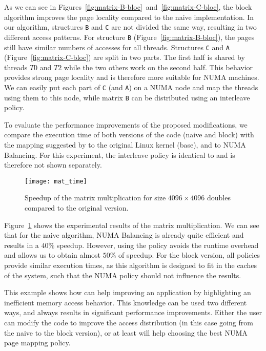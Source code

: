 As we can see in Figures~\ref{fig:matrix-B-bloc}~and~\ref{fig:matrix-C-bloc}, the block algorithm improves the page
locality compared to the naive implementation. In our algorithm, structures \texttt{B}
and \texttt{C} are not divided the same way, resulting in two different access patterns. For structure \texttt{B} (Figure~\ref{fig:matrix-B-bloc}), the pages still
have similar numbers of accesses for all threads. Structures \texttt{C} and
\texttt{A} (Figure~\ref{fig:matrix-C-bloc}) are split in two parts. The first half
is shared by threads $T0$ and $T2$ while the two others work on the second
half. This behavior provides strong page locality and is therefore more
suitable for NUMA machines. We can easily put each part of \texttt{C} (and
\texttt{A}) on a NUMA node and map the threads using them to this node, while matrix
\texttt{B} can be distributed using an interleave policy.

To evaluate the performance improvements of the proposed modifications, we compare the execution
time of both versions of the code (naive and block) with the mapping suggested by \TABARNAC to the original Linux kernel (base), and to NUMA Balancing.
For this experiment, the interleave policy is identical to \TABARNAC and is therefore not shown separately.


\begin{figure}[!t]
    \centering
    \texttt{[image: mat\_time]}
    \caption{Speedup of the matrix multiplication for size $4096\times 4096$
    doubles compared to the original version.}
    \label{fig:matrix-res}
\end{figure}

Figure~\ref{fig:matrix-res} shows the experimental results of the matrix multiplication. We can see that for
the naive algorithm, NUMA Balancing is already quite efficient and results in a $40\%$
speedup. However, using the \TABARNAC policy avoids the runtime overhead and
allows us to obtain almost $50\%$ of speedup. For the block version, all policies
provide similar execution times, as this algorithm is designed to fit in the
caches of the system, such that the NUMA policy should not influence the results.

This example shows
how \TABARNAC can help improving an application by highlighting an inefficient
memory access behavior. This knowledge can be used two different ways, and always
results in significant performance improvements. Either the user can modify the code to
improve the access distribution (in this case going from the naive to the block version),
or at least \TABARNAC will help choosing the best NUMA page mapping policy.

